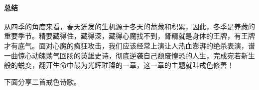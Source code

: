 \paragraph*{总结}

从四季的角度来看，春天迸发的生机源于冬天的蓄藏和积累，因此，冬季是养藏的重要季节。精要藏得住，藏得深，藏得心魔找不到，肾精就是身体的王牌，有王牌才有底气。面对心魔的疯狂攻击，我们应该经常上演让人热血澎湃的绝杀表演，谱一曲惊心动魄荡气回肠的英雄史诗，彻底逆袭自己颓废惶恐的人生，完成宛若新生般的蜕变，翻开生命中最为光辉璀璨的一章，这一章的主题就叫戒色修善！

下面分享二首戒色诗歌。

\begin{poem}[撸没一生]
    \begin{multicols}{2}
        \centering~\\

\end{multicols}
\end{poem}
